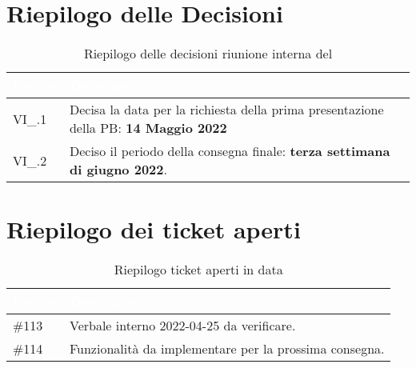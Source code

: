 \section{Riepilogo delle Decisioni}


\begin{table}[!htbp]
    \renewcommand{\arraystretch}{1.5}
    \begin{tabular}{m{}<{\centering}  m{}<{\centering}}
        \rowcolor{darkblue} \textcolor{white}{\textbf{Codice}} & \textcolor{white}{\textbf{Decisione}}                        \\
        \hline
        VI\_{}\D{}.1                                           & Decisa la data per la richiesta della prima presentazione della PB: \textbf{14 Maggio 2022} \\
        VI\_{}\D{}.2											  & Deciso il periodo della consegna finale: \textbf{terza settimana di giugno 2022}.
    \end{tabular}
    \caption{Riepilogo delle decisioni riunione interna del \D}
\end{table}

\section{Riepilogo dei ticket aperti}

\begin{table}[!htbp]
    \renewcommand{\arraystretch}{1.5}
    \begin{tabular}{m{}<{\centering}  m{}<{\centering}}
        \rowcolor{darkblue} \textcolor{white}{\textbf{Codice}} & \textcolor{white}{\textbf{Descrizione}}                        \\
        \hline
        \#{113}                                         & Verbale interno 2022-04-25 da verificare. \\
        \#{114}										  & Funzionalità da implementare per la prossima consegna.
    \end{tabular}
    \caption{Riepilogo ticket aperti in data \D}
\end{table}

